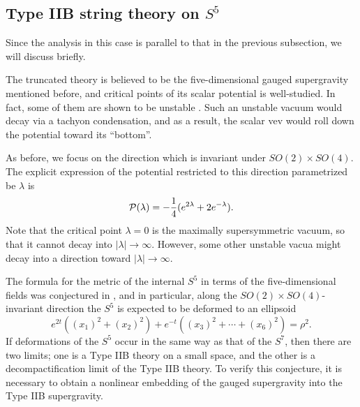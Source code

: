 \documentclass[a4paper,a4paper]{article}
\begin{document}
\vspace{1cm}

\subsection{Type IIB string theory on $S^5$}

\vspace{5mm}

Since the analysis in this case is parallel to that in the previous subsection, we will discuss briefly. 

The truncated theory is believed to be the five-dimensional gauged supergravity mentioned before, 
and critical points of its 
scalar potential is 
well-studied. 
In fact, some of them are shown to be unstable \cite{critical1}\cite{critical3}. 
Such an unstable vacuum would decay via a tachyon condensation, and as a result, the scalar vev would roll 
down the potential toward its ``bottom''. 

As before, we focus on the direction which is invariant under $SO(2)\times SO(4)$. 
The explicit expression of the potential restricted to this direction parametrized be $\lambda$ is \cite{5dim1} 
\begin{equation}
{\cal P}(\lambda) = -\frac14(e^{2\lambda}+2e^{-\lambda}). 
\end{equation}
Note that the critical point $\lambda=0$ is the maximally supersymmetric vacuum, so that it cannot decay into 
$|\lambda|\to\infty$. 
However, some other unstable vacua might decay into a direction toward $|\lambda|\to\infty$. 

The formula for the metric of the internal $S^5$ in terms of the five-dimensional fields was conjectured in 
\cite{critical3}, 
and in particular, along the $SO(2)\times SO(4)$-invariant direction the $S^5$ is expected to be deformed 
to an ellipsoid
\begin{equation}
e^{2t}((x_1)^2+(x_2)^2)+e^{-t}((x_3)^2+\cdots+(x_6)^2)=\rho^2.
\end{equation}
If deformations of the $S^5$ occur in the same way as that of the $S^7$, then there are two limits; one is a 
Type IIB theory on a small space, and the other is a decompactification limit of the Type IIB theory. 
To verify this conjecture, it is necessary to obtain a nonlinear embedding of the gauged supergravity into the 
Type IIB supergravity. 
\end{document}
